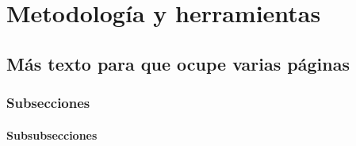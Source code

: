 \chapter{Metodología y herramientas}
\label{chap:metodologia}

 \blindtext

\section{Más texto para que ocupe varias páginas}

\blindtext
\blinditemize[4]
\blindmathpaper

\subsection{Subsecciones}

\blindtext

\subsubsection{Subsubsecciones}

\blindtext


